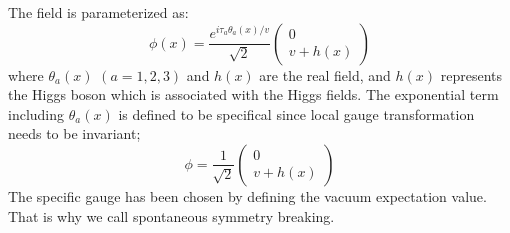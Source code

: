 
The field is parameterized as:
\begin{equation}
\phi(x)=\frac{e^{i \tau_{a} \theta_{a}(x) / v}}{\sqrt{2}}\left(\begin{array}{c}
0 \\
v+h(x)
\end{array}\right)
\end{equation}
where $\theta_{a}(x)$ $(a = 1,2,3)$ and $h(x)$ are the real field, and  $h(x)$ represents the Higgs boson which is associated with the Higgs fields. The exponential term including $\theta_{a}(x)$ is defined to be specifical since local gauge transformation needs to be invariant;
\begin{equation}
\phi=\frac{1}{\sqrt{2}}\left(\begin{array}{c}
0 \\
v+h(x)
\end{array}\right)
\end{equation}
The specific gauge has been chosen by defining the vacuum expectation value. That is why we call spontaneous symmetry breaking. 

